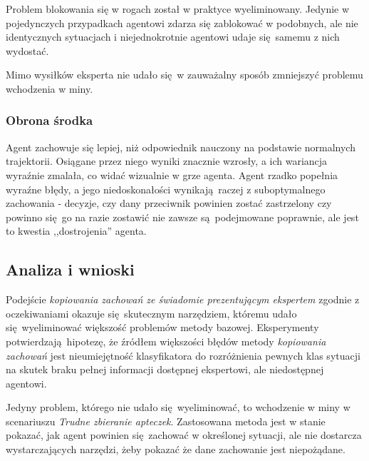 Problem blokowania się w rogach został w praktyce wyeliminowany. Jedynie w pojedynczych przypadkach agentowi zdarza się zablokować w podobnych, ale nie identycznych sytuacjach i niejednokrotnie agentowi udaje się samemu z nich wydostać.

Mimo wysiłków eksperta nie udało się w zauważalny sposób zmniejszyć problemu wchodzenia w miny.

\subsubsection{Obrona środka}
Agent zachowuje się lepiej, niż odpowiednik nauczony na podstawie normalnych trajektorii.
Osiągane przez niego wyniki znacznie wzrosły, a ich wariancja wyraźnie zmalała, co widać wizualnie w grze agenta. Agent rzadko popełnia wyraźne błędy, a jego niedoskonałości wynikają raczej z suboptymalnego zachowania - decyzje, czy dany przeciwnik powinien zostać zastrzelony czy powinno się go na razie zostawić nie zawsze są podejmowane poprawnie, ale jest to kwestia ,,dostrojenia'' agenta.

\subsection{Analiza i wnioski}

Podejście \textit{kopiowania zachowań ze świadomie prezentującym ekspertem} zgodnie z oczekiwaniami okazuje się skutecznym narzędziem, któremu udało się wyeliminować większość problemów metody bazowej. Eksperymenty potwierdzają hipotezę, że źródłem większości błędów metody \textit{kopiowania zachowań} jest nieumiejętność klasyfikatora do rozróżnienia pewnych klas sytuacji na skutek braku pełnej informacji dostępnej ekspertowi, ale niedostępnej agentowi.

Jedyny problem, którego nie udało się wyeliminować, to wchodzenie w miny w scenariuszu \textit{Trudne zbieranie apteczek}. Zastosowana metoda jest w stanie pokazać, jak agent powinien się zachować w określonej sytuacji, ale nie dostarcza wystarczających narzędzi, żeby pokazać że dane zachowanie jest niepożądane.



